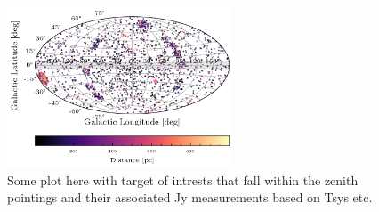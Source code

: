 \begin{figure}[h]
    \centering
    \includegraphics[width=0.6\textwidth]{figures/Science Case Plots/galactic_projection_NEA.png}
    \caption{Some plot here with target of intrests that fall within the zenith pointings and their associated Jy measurements based on Tsys etc. }
    \label{fig:enter-label}
\end{figure}